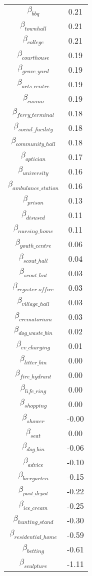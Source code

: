 \begin{tabular}{c|c}
$\beta_{bbq}$ & 0.21 \\
$\beta_{townhall}$ & 0.21 \\
$\beta_{college}$ & 0.21 \\
$\beta_{courthouse}$ & 0.19 \\
$\beta_{grave\_yard}$ & 0.19 \\
$\beta_{arts\_centre}$ & 0.19 \\
$\beta_{casino}$ & 0.19 \\
$\beta_{ferry\_terminal}$ & 0.18 \\
$\beta_{social\_facility}$ & 0.18 \\
$\beta_{community\_hall}$ & 0.18 \\
$\beta_{optician}$ & 0.17 \\
$\beta_{university}$ & 0.16 \\
$\beta_{ambulance\_station}$ & 0.16 \\
$\beta_{prison}$ & 0.13 \\
$\beta_{disused}$ & 0.11 \\
$\beta_{nursing\_home}$ & 0.11 \\
$\beta_{youth\_centre}$ & 0.06 \\
$\beta_{scout\_hall}$ & 0.04 \\
$\beta_{scout\_hut}$ & 0.03 \\
$\beta_{register\_office}$ & 0.03 \\
$\beta_{village\_hall}$ & 0.03 \\
$\beta_{crematorium}$ & 0.03 \\
$\beta_{dog\_waste\_bin}$ & 0.02 \\
$\beta_{ev\_charging}$ & 0.01 \\
$\beta_{litter\_bin}$ & 0.00 \\
$\beta_{fire\_hydrant}$ & 0.00 \\
$\beta_{life\_ring}$ & 0.00 \\
$\beta_{shopping}$ & 0.00 \\
$\beta_{shower}$ & -0.00 \\
$\beta_{seat}$ & 0.00 \\
$\beta_{dog\_bin}$ & -0.06 \\
$\beta_{advice}$ & -0.10 \\
$\beta_{biergarten}$ & -0.15 \\
$\beta_{post\_depot}$ & -0.22 \\
$\beta_{ice\_cream}$ & -0.25 \\
$\beta_{hunting\_stand}$ & -0.30 \\
$\beta_{residential\_home}$ & -0.59 \\
$\beta_{betting}$ & -0.61 \\
$\beta_{sculpture}$ & -1.11 \\
\end{tabular}
